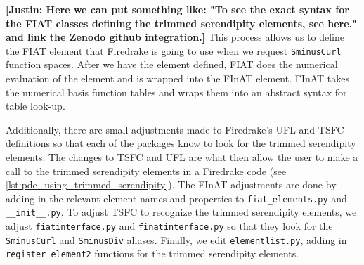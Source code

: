 \documentclass[format=acmsmall,screen,timestamp=false,a4paper]{acmart}
\newcommand\josh[1]{\textbf{\textcolor[rgb]{0,.5,1}{[Josh: #1]}}}
\newcommand\justin[1]{\textbf{\textcolor[rgb]{0,1,0.5}{[Justin: #1]}}}
\begin{document}
 \justin{Here we can put something like:  "To see the exact syntax for the FIAT classes defining the trimmed serendipity elements, see here."  and link the Zenodo github integration.}  This process allows us to define the FIAT element that Firedrake is going to use when we request \texttt{SminusCurl} function spaces.  After we have the element defined, FIAT does the numerical evaluation of the element and is wrapped into the FInAT element.  FInAT takes the numerical basis function tables and wraps them into an abstract syntax for table look-up.   
 
%    

Additionally, there are small adjustments made to Firedrake's UFL and TSFC definitions so that each of the packages know to look for the trimmed serendipity elements.  The changes to TSFC and UFL are what then allow the user to make a call to the trimmed serendipity elements in a Firedrake code (see \cref{lst:pde_using_trimmed_serendipity}).  The FInAT adjustments are done by adding in the relevant element names and properties to \texttt{fiat\_elements.py} and \texttt{\_\_init\_\_.py}. To adjust TSFC to recognize the trimmed serendipity elements, we adjust \texttt{fiatinterface.py} and \texttt{finatinterface.py} so that they look for the \texttt{SminusCurl} and \texttt{SminusDiv} aliases.  Finally, we edit \texttt{elementlist.py}, adding in \texttt{register\_element2} functions for the trimmed serendipity elements. %
\end{document}
